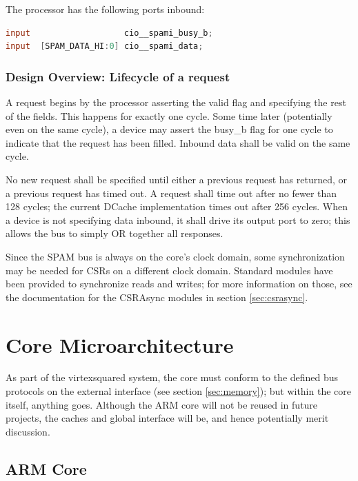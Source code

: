 \documentclass[10pt]{report}
\begin{document}
The processor has the following ports inbound:

\begin{lstlisting}[basicstyle=\footnotesize,language=Verilog]
input                   cio__spami_busy_b;
input  [SPAM_DATA_HI:0] cio__spami_data;
\end{lstlisting}

\subsubsection{Design Overview: Lifecycle of a request}

A request begins by the processor asserting the valid flag and specifying
the rest of the fields. This happens for exactly one cycle. Some time later
(potentially even on the same cycle), a device may assert the busy\_b flag
for one cycle to indicate that the request has been filled. Inbound data
shall be valid on the same cycle.

No new request shall be specified until either a previous request has returned, 
or a previous request has timed out. A request shall time out after no fewer 
than 128 cycles; the current DCache implementation times out after 256 cycles. 
When a device is not specifying data inbound, it shall drive its output port to 
zero; this allows the bus to simply OR together all responses.

Since the SPAM bus is always on the core's clock domain, some synchronization 
may be needed for CSRs on a different clock domain. Standard modules have been 
provided to synchronize reads and writes; for more information on those, see 
the documentation for the CSRAsync modules in section \ref{sec:csrasync}. 

\section{Core Microarchitecture}

As part of the virtexsquared system, the core must conform to the defined
bus protocols on the external interface (see section \ref{sec:memory}); but
within the core itself, anything goes.  Although the ARM core will not be
reused in future projects, the caches and global interface will be, and
hence potentially merit discussion.

\subsection{ARM Core}
\end{document}
